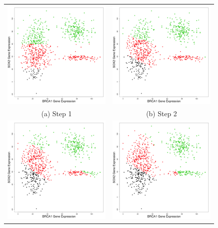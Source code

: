 \documentclass[11pt]{article}
\begin{document}
\begin{figure}
\begin{tabular}{c c}
    \includegraphics[width=65mm]{../tissue2_plots/cluster_step1.png} & 
    \includegraphics[width=65mm]{../tissue2_plots/cluster_step2.png} \\
    (a) Step 1 & (b) Step 2 \\
    \includegraphics[width=65mm]{../tissue2_plots/cluster_step3.png} & 
    \includegraphics[width=65mm]{../tissue2_plots/cluster_step4.png} \\

\end{tabular}
\end{figure}
\end{document}
